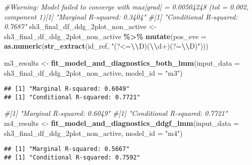 \documentclass[
]{article}
\newenvironment{Shaded}{\begin{snugshade}}{\end{snugshade}}
\newcommand{\AttributeTok}[1]{\textcolor[rgb]{0.13,0.29,0.53}{#1}}
\newcommand{\CommentTok}[1]{\textcolor[rgb]{0.56,0.35,0.01}{\textit{#1}}}
\newcommand{\FunctionTok}[1]{\textcolor[rgb]{0.13,0.29,0.53}{\textbf{#1}}}
\newcommand{\NormalTok}[1]{#1}
\newcommand{\OtherTok}[1]{\textcolor[rgb]{0.56,0.35,0.01}{#1}}
\newcommand{\SpecialCharTok}[1]{\textcolor[rgb]{0.81,0.36,0.00}{\textbf{#1}}}
\newcommand{\StringTok}[1]{\textcolor[rgb]{0.31,0.60,0.02}{#1}}
\begin{document}
\begin{Shaded}
\begin{Highlighting}[]
\CommentTok{\#Warning: Model failed to converge with max|grad| = 0.00504248 (tol = 0.002, component 1)[1] "Marginal R{-}squared: 0.3404"}
\CommentTok{\#[1] "Conditional R{-}squared: 0.7687"}
\NormalTok{sh3\_final\_df\_ddg\_2plot\_non\_active }\OtherTok{\textless{}{-}}\NormalTok{ sh3\_final\_df\_ddg\_2plot\_non\_active }\SpecialCharTok{\%\textgreater{}\%}
  \FunctionTok{mutate}\NormalTok{(}\AttributeTok{pos\_eve =} \FunctionTok{as.numeric}\NormalTok{(}\FunctionTok{str\_extract}\NormalTok{(id\_ref, }\StringTok{"(?\textless{}=}\SpecialCharTok{\textbackslash{}\textbackslash{}}\StringTok{D)(}\SpecialCharTok{\textbackslash{}\textbackslash{}}\StringTok{d+)(?=}\SpecialCharTok{\textbackslash{}\textbackslash{}}\StringTok{D)"}\NormalTok{)))}

\NormalTok{m3\_results }\OtherTok{\textless{}{-}} \FunctionTok{fit\_model\_and\_diagnostics\_both\_lmm}\NormalTok{(}\AttributeTok{input\_data =}\NormalTok{ sh3\_final\_df\_ddg\_2plot\_non\_active, }\AttributeTok{model\_id =} \StringTok{"m3"}\NormalTok{)}
\end{Highlighting}
\end{Shaded}

\begin{verbatim}
## [1] "Marginal R-squared: 0.6049"
## [1] "Conditional R-squared: 0.7721"
\end{verbatim}

\begin{Shaded}
\begin{Highlighting}[]
\CommentTok{\#[1] "Marginal R{-}squared: 0.6049"}
\CommentTok{\#[1] "Conditional R{-}squared: 0.7721"}
\NormalTok{m4\_results }\OtherTok{\textless{}{-}} \FunctionTok{fit\_model\_and\_diagnostics\_ddgf\_lmm}\NormalTok{(}\AttributeTok{input\_data =}\NormalTok{ sh3\_final\_df\_ddg\_2plot\_non\_active, }\AttributeTok{model\_id =} \StringTok{"m4"}\NormalTok{)}
\end{Highlighting}
\end{Shaded}

\begin{verbatim}
## [1] "Marginal R-squared: 0.5667"
## [1] "Conditional R-squared: 0.7592"
\end{verbatim}
\end{document}
